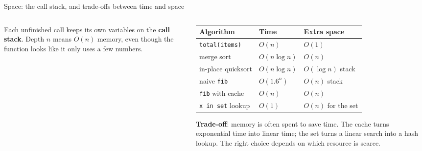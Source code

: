 \documentclass[aspectratio=169,10pt]{beamer}
\begin{document}
\begin{frame}{Space: the call stack, and trade-offs between time and space}
\begin{columns}[T]
\begin{column}{0.42\textwidth}
\begin{sfig}[0.7]
\end{sfig}
{\small Each unfinished call keeps its own variables on the \textbf{call stack}. Depth $n$ means $O(n)$ memory, even though the function looks like it only uses a few numbers.}
\end{column}
\begin{column}{0.54\textwidth}
\renewcommand{\arraystretch}{1.28}\footnotesize
\begin{tabular}{@{}>{\raggedright}p{31mm}>{\raggedright}p{14mm}>{\raggedright\arraybackslash}p{22mm}@{}}
\toprule
Algorithm & Time & Extra space\\\midrule
\texttt{total(items)} & $O(n)$ & $O(1)$\\
merge sort & $O(n\log n)$ & $O(n)$\\
in-place quicksort & $O(n\log n)$ & $O(\log n)$ stack\\
naive \texttt{fib} & $O(1.6^n)$ & $O(n)$ stack\\
\texttt{fib} with cache & $O(n)$ & $O(n)$\\
\texttt{x in set} lookup & $O(1)$ & $O(n)$ for the set\\
\bottomrule
\end{tabular}
\vspace{2mm}

{\small \textbf{Trade-off}: memory is often spent to save time. The cache turns exponential time into linear time; the set turns a linear search into a hash lookup. The right choice depends on which resource is scarce.}
\end{column}
\end{columns}
\end{frame}
\end{document}
